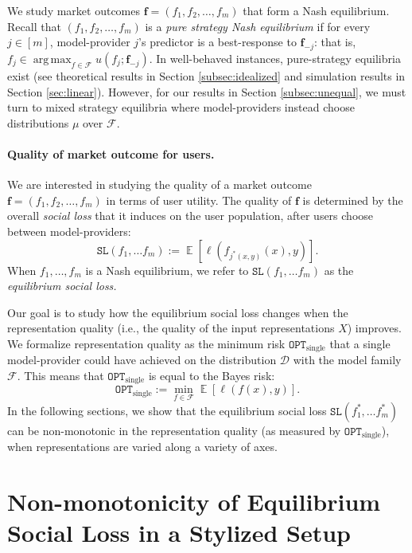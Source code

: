\documentclass[letterpaper,11pt]{article}
\theoremstyle{plain}
\DeclareMathOperator*{\argmax}{arg\,max}
\DeclareMathOperator*{\E}{\mathbb{E}}
\begin{document}
We study market outcomes $\mathbf{f} = (f_1, f_2, \ldots, f_m)$ that form a Nash equilibrium. Recall that $(f_1, f_2, \ldots, f_m)$ is a \textit{pure strategy Nash equilibrium} if for every $j \in [m]$, model-provider $j$'s predictor is a best-response to $\mathbf{f}_{-j}$: that is, $f_j \in \argmax_{f\in \mathcal{F}} u(f_j; \mathbf{f}_{-j})$. In well-behaved instances, pure-strategy equilibria exist (see theoretical results in Section \ref{subsec:idealized} and simulation results in Section \ref{sec:linear}). However, for our results in Section \ref{subsec:unequal}, we must turn to mixed strategy equilibria where model-providers instead choose distributions $\mu$ over $\mathcal{F}$. 


\paragraph{Quality of market outcome for users.}
We are interested in studying the quality of a market outcome $\mathbf{f} = (f_1, f_2, \ldots, f_m)$ in terms of user utility. The quality of $\mathbf{f}$ is determined by the overall \textit{social loss} that it induces on the user population, after users choose between model-providers:
\begin{equation}
\label{eq:sociallossdef}
  \texttt{SL}(f_1, \ldots f_m) := \E[\ell(f_{j^*(x,y)}(x),y)]. 
\end{equation}
When $f_1, \ldots, f_m$ is a Nash equilibrium, we refer to $\texttt{SL}(f_1, \ldots f_m)$ as the \textit{equilibrium social loss.}

Our goal is to study how the equilibrium social loss changes when the representation quality (i.e., the quality of the input representations $X$) improves. We formalize representation quality as the minimum risk $\texttt{OPT}_{\text{single}}$ that a single model-provider could have achieved on the distribution $\mathcal{D}$ with the model family $\mathcal{F}$. This means that $\texttt{OPT}_{\text{single}}$ is equal to the Bayes risk:  
\[\texttt{OPT}_{\text{single}} := \min_{f \in \mathcal{F}} \E\left[ \ell(f(x),y)\right].\]
In the following sections, we show that the equilibrium social loss $\texttt{SL}(f^*_1, \ldots f^*_m)$ can be non-monotonic in the representation quality (as measured by $\texttt{OPT}_{\text{single}}$), when representations are varied along a variety of axes. 


\section{Non-monotonicity of Equilibrium Social Loss in a Stylized Setup}\label{sec:theory}
\end{document}
